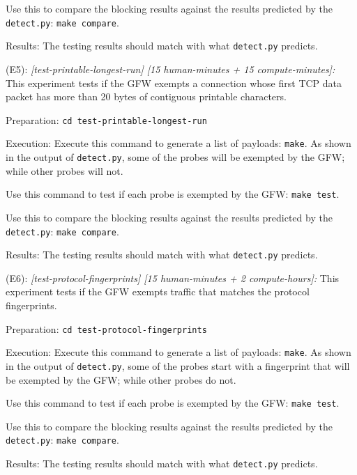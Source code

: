 \begin{compactdesc}
\begin{asparadesc}
        Use this to compare the blocking results against the results predicted by the \texttt{detect.py}:
        \texttt{make compare}.

        \item[Results:] The testing results should match with what \texttt{detect.py} predicts.
    \end{asparadesc}
    
    \item[(E5):] \textit{[test-printable-longest-run] [15 human-minutes + 15 compute-minutes]:}
    This experiment tests if the GFW exempts a connection whose
    first TCP data packet has more than 20 bytes of contiguous printable characters.
    \begin{asparadesc}
        \item[Preparation:] \texttt{cd test-printable-longest-run}

        \item[Execution:]
        Execute this command to generate a list of payloads: \texttt{make}. 
        As shown in the output of \texttt{detect.py},
        some of the probes will be exempted by the GFW; 
        while other probes will not.

        Use this command to test if each probe is exempted by the GFW:
        \texttt{make test}.

        Use this to compare the blocking results against the results predicted by the \texttt{detect.py}:
        \texttt{make compare}.

        \item[Results:] The testing results should match with what \texttt{detect.py} predicts.
    \end{asparadesc}
    
    \item[(E6):] \textit{[test-protocol-fingerprints] [15 human-minutes + 2 compute-hours]:}
    This experiment tests if the GFW exempts traffic that matches the protocol fingerprints.
    \begin{asparadesc}
        \item[Preparation:] \texttt{cd test-protocol-fingerprints}

        \item[Execution:]
        Execute this command to generate a list of payloads: \texttt{make}. 
        As shown in the output of \texttt{detect.py},
        some of the probes start with
        a fingerprint that will be exempted by the GFW; 
        while other probes do not.

        Use this command to test if each probe is exempted by the GFW:
        \texttt{make test}.

        Use this to compare the blocking results against the results predicted by the \texttt{detect.py}:
        \texttt{make compare}.

        \item[Results:] The testing results should match with what \texttt{detect.py} predicts.
    \end{asparadesc}
    

\end{compactdesc}

